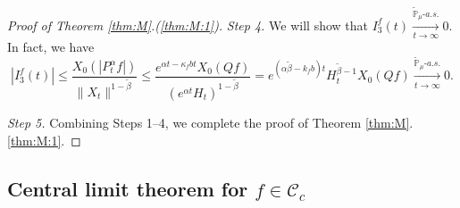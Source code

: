 \documentclass[EJP]{ejpecp} %
\begin{document}
\begin{proof}[Proof of Theorem \ref{thm:M}.(\ref{thm:M:1})]
	\emph{Step 4.} We will show that $I^f_3(t) \xrightarrow[t\to \infty]{\widetilde {\mathbb P}_\mu \text{-} a.s.} 0$.
	In fact, we have
\begin{equation}
	|I^f_3(t)|
	\leq \frac{X_0(|P^\alpha_tf|)}{\|X_t\|^{1 - \tilde \beta }}
	\leq \frac{e^{\alpha t - \kappa_f b t}X_0(Qf)}{(e^{\alpha t} H_t)^{1 - \tilde \beta}}
	= e^{(\alpha \tilde \beta - k_fb)t} H_t^{\tilde \beta - 1} X_0(Qf)
	\xrightarrow[t\to \infty]{\widetilde {\mathbb P}_\mu \text{-} a.s.} 0.
\end{equation}

	\emph{Step 5.} Combining Steps 1--4, we complete the proof of Theorem  \ref{thm:M}.\eqref{thm:M:1}.
\end{proof}

\subsection{Central limit theorem for $f \in \mathcal C_c$}
\end{document}
